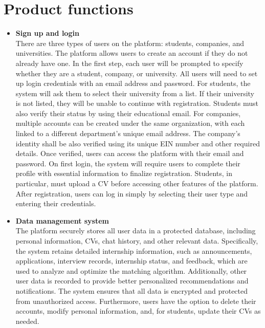 \section{Product functions}\label{subsec:product_functions}
\begin{itemize}[label={ }]
    \item \textcolor{bluepoli}{\textbf{Sign up and login}} 
    \\There are three types of users on the platform: students, companies, and universities. The platform allows users to create an account if they do not already 
    have one. In the first step, each user will be prompted to specify whether they are a student, company, or university. All users will need to set up login
    credentials with an email address and password.
    For students, the system will ask them to select their university from a list. If their university is not listed, they will be unable to continue with
    registration. Students must also verify their status by using their educational email.
    For companies, multiple accounts can be created under the same organization, with each linked to a different department’s unique email address. The 
    company’s identity shall be also verified using its unique EIN number and other required details.
    Once verified, users can access the platform with their email and password. On first login, the system will require users to complete their profile with
    essential information to finalize registration. Students, in particular, must upload a CV before accessing other features of the platform.
    After registration, users can log in simply by selecting their user type and entering their credentials.

    \item \textcolor{bluepoli}{\textbf{Data management system}}
    \\ The platform securely stores all user data in a protected database, including personal information, CVs, chat history, and other relevant data. 
    Specifically, the system retains detailed internship information, such as announcements, applications, interview records, internship status, and 
    feedback, which are used to analyze and optimize the matching algorithm. Additionally, other user data is recorded to provide better personalized 
    recommendations and notifications. The system ensures that all data is encrypted and protected from unauthorized access.
    Furthermore, users have the option to delete their accounts, modify personal information, and, for students, update their CVs as needed.


\end{itemize}
